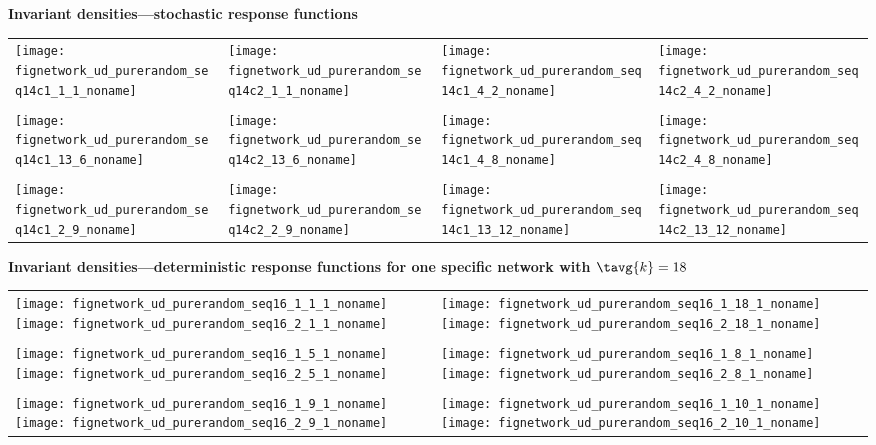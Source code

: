   \textbf{Invariant densities---stochastic response functions}
  \begin{tabular}{llll}
    \texttt{[image: fignetwork\_ud\_purerandom\_seq14c1\_1\_1\_noname]} &
    \texttt{[image: fignetwork\_ud\_purerandom\_seq14c2\_1\_1\_noname]} &
    \texttt{[image: fignetwork\_ud\_purerandom\_seq14c1\_4\_2\_noname]} &
    \texttt{[image: fignetwork\_ud\_purerandom\_seq14c2\_4\_2\_noname]} \\
    \\
    \texttt{[image: fignetwork\_ud\_purerandom\_seq14c1\_13\_6\_noname]} &
    \texttt{[image: fignetwork\_ud\_purerandom\_seq14c2\_13\_6\_noname]} &
    \texttt{[image: fignetwork\_ud\_purerandom\_seq14c1\_4\_8\_noname]} &
    \texttt{[image: fignetwork\_ud\_purerandom\_seq14c2\_4\_8\_noname]} \\
    \\
    \texttt{[image: fignetwork\_ud\_purerandom\_seq14c1\_2\_9\_noname]} &
    \texttt{[image: fignetwork\_ud\_purerandom\_seq14c2\_2\_9\_noname]} &
    \texttt{[image: fignetwork\_ud\_purerandom\_seq14c1\_13\_12\_noname]} &
    \texttt{[image: fignetwork\_ud\_purerandom\_seq14c2\_13\_12\_noname]} \\
  \end{tabular}



  \textbf{Invariant densities---deterministic response functions for one specific network with $\tavg{k}=18$}
  \begin{tabular}{ll}
    \texttt{[image: fignetwork\_ud\_purerandom\_seq16\_1\_1\_1\_noname]}%
    \texttt{[image: fignetwork\_ud\_purerandom\_seq16\_2\_1\_1\_noname]} &
    \qquad    \texttt{[image: fignetwork\_ud\_purerandom\_seq16\_1\_18\_1\_noname]}%
    \texttt{[image: fignetwork\_ud\_purerandom\_seq16\_2\_18\_1\_noname]} \\
    \\
    \texttt{[image: fignetwork\_ud\_purerandom\_seq16\_1\_5\_1\_noname]}%
    \texttt{[image: fignetwork\_ud\_purerandom\_seq16\_2\_5\_1\_noname]} &
    \qquad    \texttt{[image: fignetwork\_ud\_purerandom\_seq16\_1\_8\_1\_noname]}%
    \texttt{[image: fignetwork\_ud\_purerandom\_seq16\_2\_8\_1\_noname]} \\
    \\
    \texttt{[image: fignetwork\_ud\_purerandom\_seq16\_1\_9\_1\_noname]}%
    \texttt{[image: fignetwork\_ud\_purerandom\_seq16\_2\_9\_1\_noname]} &
    \qquad    \texttt{[image: fignetwork\_ud\_purerandom\_seq16\_1\_10\_1\_noname]}%
    \texttt{[image: fignetwork\_ud\_purerandom\_seq16\_2\_10\_1\_noname]} \\
  \end{tabular}


